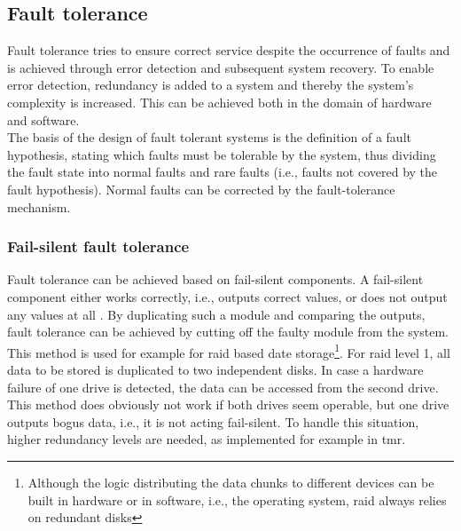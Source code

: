 \subsection{Fault tolerance}
Fault tolerance tries to ensure correct service despite the occurrence of faults and is achieved through error detection and subsequent system recovery.
To enable error detection, redundancy is added to a system and thereby the 
system's complexity is increased. This can be achieved both in the domain of hardware and software. 
\\
The basis of the design of fault tolerant systems is the definition of a fault hypothesis, stating which faults must be tolerable by the system, thus
dividing the fault state into normal faults and rare faults (i.e., faults not covered by the fault hypothesis). Normal faults can be corrected by the fault-tolerance
mechanism. 

\subsubsection{Fail-silent fault tolerance}
Fault tolerance can be achieved based on fail-silent components. A fail-silent component
either works correctly, i.e., outputs correct values, or does not output any values at all \cite{544479}. By duplicating such a module and comparing the
outputs, fault tolerance can be achieved by cutting off the faulty module from the system.
\\
This method is used for example for \gls{raid} based date storage\footnote{Although the logic distributing
the data chunks to different devices can be built in hardware or in software, i.e., the operating system, \gls{raid} always relies on redundant disks}.
For \gls{raid} level 1, all data to be stored is duplicated to two independent disks. In case a hardware failure of one drive is detected, the data can be accessed
from the second drive. This method does obviously not work if both drives seem operable, but one drive outputs bogus data, i.e., it is not acting fail-silent.
To handle this situation, higher redundancy levels are needed, as implemented for example in \gls{tmr}. 

